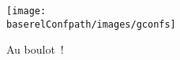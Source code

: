 \documentclass{beamer}
\begin{document}
\title{\workshoptitle}
\author{Aurélien \textit{Aurag} \textsc{Legrand} \and \textsc{GConfs}}
\date{Vendredi 03 décembre 2010}

\begin{frame}
  \begin{center}
    \texttt{[image: \\baserelConfpath/images/gconfs]}
  \end{center}

  \maketitle
\end{frame}

\begin{frame}
  \tableofcontents
\end{frame}









\begin{frame}
  Au boulot~!
\end{frame}
\end{document}
